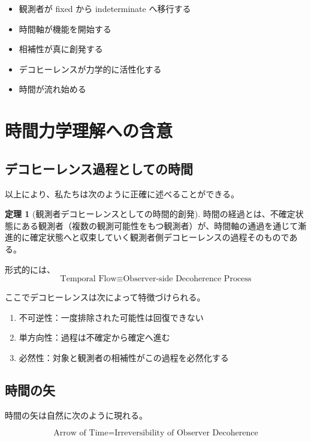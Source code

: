 \documentclass[12pt,a4paper]{article}
\theoremstyle{definition}
\newtheorem{theorem}[definition]{定理}
\begin{document}
\begin{itemize}
    \item 観測者が fixed から indeterminate へ移行する
    \item 時間軸が機能を開始する
    \item 相補性が真に創発する
    \item デコヒーレンスが力学的に活性化する
    \item 時間が流れ始める
\end{itemize}

\section{時間力学理解への含意}

\subsection{デコヒーレンス過程としての時間}

以上により、私たちは次のように正確に述べることができる。

\begin{theorem}[観測者デコヒーレンスとしての時間的創発]
時間の経過とは、不確定状態にある観測者（複数の観測可能性をもつ観測者）が、時間軸の通過を通じて漸進的に確定状態へと収束していく観測者側デコヒーレンスの過程そのものである。

形式的には、
\begin{equation}
\text{Temporal Flow} \equiv \text{Observer-side Decoherence Process}
\end{equation}

ここでデコヒーレンスは次によって特徴づけられる。
\begin{enumerate}
    \item 不可逆性：一度排除された可能性は回復できない
    \item 単方向性：過程は不確定から確定へ進む
    \item 必然性：対象と観測者の相補性がこの過程を必然化する
\end{enumerate}
\end{theorem}

\subsection{時間の矢}

時間の矢は自然に次のように現れる。

\begin{equation}
\text{Arrow of Time} = \text{Irreversibility of Observer Decoherence}
\end{equation}
\end{document}
